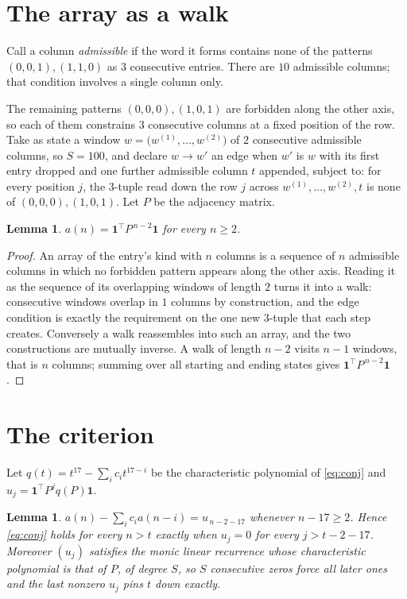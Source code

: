 \documentclass[11pt,a4paper]{article}
\theoremstyle{plain}
\newtheorem{lemma}[theorem]{Lemma}
\theoremstyle{definition}
\begin{document}
\section{The array as a walk}

Call a column \emph{admissible} if the word it forms contains none of the patterns
$(0,0,1), (1,1,0)$ as $3$ consecutive entries. There are $10$ admissible columns; that condition
involves a single column only.

The remaining patterns $(0,0,0), (1,0,1)$ are forbidden along the other axis, so each of them
constrains $3$ consecutive columns at a fixed position of the row. Take as state a
window $w=\bigl(w^{(1)},\dots,w^{(2)}\bigr)$ of $2$ consecutive admissible
columns, so $S=100$, and declare $w\to w'$ an edge when $w'$ is $w$ with its first entry
dropped and one further admissible column $t$ appended, subject to: for every position
$j$, the $3$-tuple read down the row $j$ across $w^{(1)},\dots,w^{(2)},t$
is none of $(0,0,0), (1,0,1)$. Let $P$ be the adjacency matrix.

\begin{lemma}\label{lem:walk}
$a(n)=\mathbf{1}^{\!\top}P^{\,n-2}\mathbf{1}$ for every $n\ge2$.
\end{lemma}

\begin{proof}
An array of the entry's kind with $n$ columns is a sequence of $n$ admissible columns in
which no forbidden pattern appears along the other axis. Reading it as the sequence of its
overlapping windows of length $2$ turns it into a walk: consecutive windows overlap in
$1$ columns by construction, and the edge condition is exactly the requirement on the one
new $3$-tuple that each step creates. Conversely a walk reassembles into such an array,
and the two constructions are mutually inverse. A walk of length $n-2$ visits $n-1$
windows, that is $n$ columns; summing over all starting and ending states gives
$\mathbf{1}^{\!\top}P^{\,n-2}\mathbf{1}$.
\end{proof}

\section{The criterion}

Let $q(t)=t^{17}-\sum_i c_i t^{17-i}$ be the characteristic polynomial of
\eqref{eq:conj} and $u_j=\mathbf{1}^{\!\top}P^{j}q(P)\mathbf{1}$.

\begin{lemma}\label{lem:crit}
$a(n)-\sum_i c_i a(n-i)=u_{\,n-2-17}$ whenever $n-17\ge2$. Hence
\eqref{eq:conj} holds for every $n>t$ exactly when $u_j=0$ for every
$j>t-2-17$. Moreover $(u_j)$ satisfies the monic linear recurrence whose
characteristic polynomial is that of $P$, of degree $S$, so $S$ consecutive zeros force all
later ones and the last nonzero $u_j$ pins $t$ down exactly.
\end{lemma}
\end{document}
